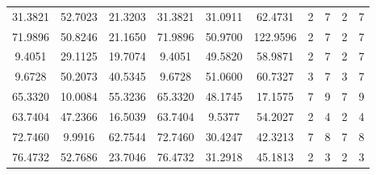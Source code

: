 \documentclass[withoutpreface,bwprint]{cumcmthesis} %
\begin{document}
\begin{appendices}
\begin{table}[htbp!]
\begin{tabular}{@{}cccccccccc@{}}
						31.3821                          & 52.7023                          & 21.3203                          & 31.3821                          & 31.0911                          & 62.4731                          & 2                    & 7                    & 2                      & 7                      \\ \cmidrule(lr){7-7}
						71.9896                          & 50.8246                          & 21.1650                          & 71.9896                          & 50.9700                          & 122.9596                         & 2                    & 7                    & 2                      & 7                      \\
						9.4051                           & 29.1125                          & 19.7074                          & 9.4051                           & 49.5820                          & 58.9871                          & 2                    & 7                    & 2                      & 7                      \\
						9.6728                           & 50.2073                          & 40.5345                          & 9.6728                           & 51.0600                          & 60.7327                          & 3                    & 7                    & 3                      & 7                      \\
						65.3320                          & 10.0084                          & 55.3236                          & 65.3320                          & 48.1745                          & 17.1575                          & 7                    & 9                    & 7                      & 9                      \\
						63.7404                          & 47.2366                          & 16.5039                          & 63.7404                          & 9.5377                           & 54.2027                          & 2                    & 4                    & 2                      & 4                      \\
						72.7460                          & 9.9916                           & 62.7544                          & 72.7460                          & 30.4247                          & 42.3213                          & 7                    & 8                    & 7                      & 8                      \\
						76.4732                          & 52.7686                          & 23.7046                          & 76.4732                          & 31.2918                          & 45.1813                          & 2                    & 3                    & 2                      & 3                      \\

\end{tabular}
\end{table}
\end{appendices}
\end{document}
